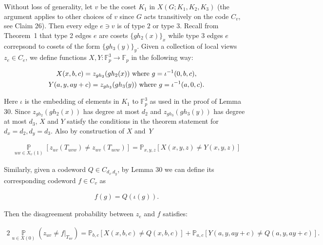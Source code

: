 Without loss of generality, let $v$ be the coset $K_{1}$ in $X(G;K_{1},K_{2},K_{3})$ (the argument applies to other choices of $v$ since $G$ acts transitively on the code $C_{v}$, see Claim 26).
Then every edge $e\ni v$ is of type $2$ or type $3$. Recall from Theorem 1 that type 2 edges $e$ are cosets $\{gh_{2}(x)\}_{x}$ while type 3 edges $e$ correpsond to cosets of the form $\{gh_{3}(y)\}_{y}$.
Given a collection of local views $z_{e}\in C_{e}$, we define functions $X,Y:\mathbb{F}_{p}^{3}\to\mathbb{F}_{p}$ in the following way:\par


\[\begin{gathered}
\displaystyle X(x,b,c)=z_{gh_{2}}(gh_{2}(x))\nobreak\ \text{where }g=\iota^{-1}(0,b,c), \\
\displaystyle Y(a,y,ay+c)=z_{gh_{3}}(gh_{3}(y))\nobreak\ \text{where }g=\iota^{-1}(a,0,c).
\end{gathered}\]


Here $\iota$ is the embedding of elements in $K_{1}$ to $\mathbb{F}_{p}^{3}$ as used in the proof of Lemma 30. Since $z_{gh_{2}}(gh_{2}(x))$ has degree at most $d_{2}$ and $z_{gh_{3}}(gh_{3}(y))$ has degree at most $d_{3}$, $X$ and $Y$ satisfy the conditions in the theorem statement for $d_{x}=d_{2},d_{y}=d_{3}$. Also by construction of $X$ and $Y$\par


\[\begin{gathered}
\displaystyle\operatorname*{\mathbb{P}}_{uw\in X_{v}(1)}[z_{uv}(T_{uvw})\neq z_{wv}(T_{uvw})]=\mathbb{P}_{x,y,z}[X(x,y,z)\not=Y(x,y,z)]
\end{gathered}\]




Similarly, given a codeword $Q\in C_{d_{x}.d_{y}}$, by Lemma 30 we can define its corresponding codeword $f\in C_{v}$ as\par


\[\begin{gathered}
f(g)=Q(\iota(g)).
\end{gathered}\]


Then the disagreement probability between $z_{e}$ and $f$ satisfies:\par


\[\begin{gathered}
2\operatorname*{\mathbb{P}}_{u\in X(0)}(z_{uv}\neq f|_{T_{uv}})=\mathbb{P}_{b,c}[X(x,b,c)\not=Q(x,b,c)]+\mathbb{P}_{a,c}[Y(a,y,ay+c)\not=Q(a,y,ay+c)].
\end{gathered}\]





